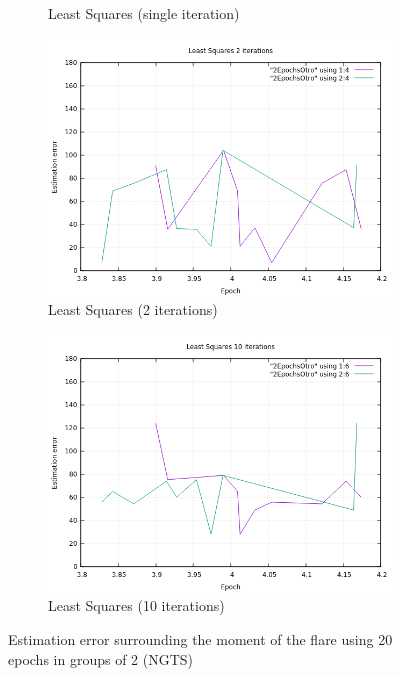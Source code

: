 \begin{figure}[!htb]
\begin{subfigure}[b]{0.5\textwidth}
		\caption{Least Squares (single iteration)}
	\end{subfigure}
	\hfill
	\begin{subfigure}[b]{0.5\textwidth}
		\includegraphics[width=\linewidth]{images/resultsStellar/20Epochs2Epochs/2EpochsOtroLS2.png}
		\caption{Least Squares (2 iterations)}
	\end{subfigure}
	\hfill
	\begin{subfigure}[b]{0.5\textwidth}
		\includegraphics[width=\linewidth]{images/resultsStellar/20Epochs2Epochs/2EpochsOtroLS10.png}
		\caption{Least Squares (10 iterations)}
	\end{subfigure}
	\caption{Estimation error surrounding the moment of the flare using 20 epochs in groups of 2 (NGTS)}
	\label{fig:UL1Epoch102Group}
\end{figure}

